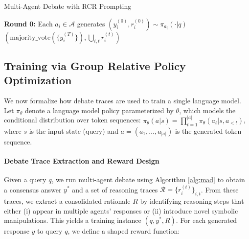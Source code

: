 \documentclass[11pt]{article}
\begin{document}
\begin{algorithm}[t]
\small
\caption{Multi-Agent Debate with \textsc{RCR} Prompting}
\label{alg:mad}
\SetAlgoNoLine
{}
\textbf{Round 0:} Each $a_i \in \mathcal{A}$ generates $(y_i^{(0)}, r_i^{(0)}) \sim \pi_{a_i}(\cdot | q)$\;
\Return $(\text{majority\_vote}(\{y_i^{(T)}\}), \bigcup_{i,t} r_i^{(t)})$
\end{algorithm}

\subsection{Training via Group Relative Policy Optimization}
\label{sec:grpo_training}

We now formalize how debate traces are used to train a single language model. Let $\pi_\theta$ denote a language model policy parameterized by $\theta$, which models the conditional distribution over token sequences: $\pi_\theta(a|s) = \prod_{t=1}^{|a|} \pi_\theta(a_t | s, a_{<t})$, where $s$ is the input state (query) and $a = (a_1, \ldots, a_{|a|})$ is the generated token sequence.

\paragraph{Debate Trace Extraction and Reward Design} Given a query $q$, we run multi-agent debate using Algorithm \ref{alg:mad} to obtain a consensus answer $y^*$ and a set of reasoning traces $\mathcal{R} = \{r_i^{(t)}\}_{i,t}$. From these traces, we extract a consolidated rationale $R$ by identifying reasoning steps that either (i) appear in multiple agents' responses or (ii) introduce novel symbolic manipulations. This yields a training instance $(q, y^*, R)$. For each generated response $y$ to query $q$, we define a shaped reward function:
\end{document}
